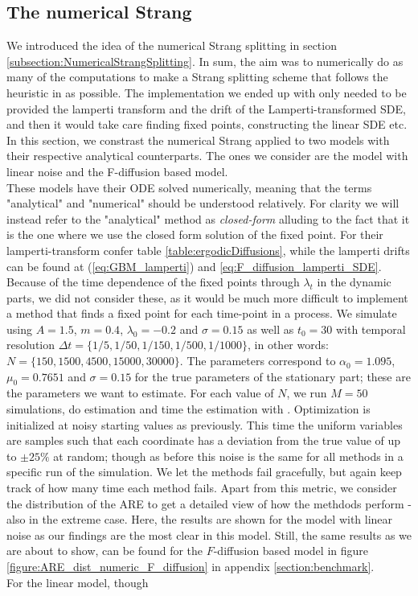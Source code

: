 \subsection{The numerical Strang}
We introduced the idea of the numerical Strang splitting in section \ref{subsection:NumericalStrangSplitting}. In sum, the aim was to numerically do as many of the computations to make a Strang splitting scheme that follows the heuristic in \cite{SplittingSchemes} as possible. The implementation we ended up with only needed to be provided the lamperti transform and the drift of the Lamperti-transformed SDE, and then it would take care finding fixed points, constructing the linear SDE etc. In this section, we constrast the numerical Strang applied to two models with their respective analytical counterparts. The ones we consider are the model with linear noise and the F-diffusion based model. \\These models have their ODE solved numerically, meaning that the terms "analytical" and "numerical" should be understood relatively. For clarity we will instead refer to the "analytical" method as \textit{closed-form} alluding to the fact that it is the one where we use the closed form solution of the fixed point. For their lamperti-transform confer table \ref{table:ergodicDiffusions}, while the lamperti drifts can be found at (\ref{eq:GBM_lamperti}) and \ref{eq:F_diffusion_lamperti_SDE}. Because of the time dependence of the fixed points through $\lambda_t$ in the dynamic parts, we did not consider these, as it would be much more difficult to implement a method that finds a fixed point for each time-point in a process. We simulate using $A = 1.5$, $m=0.4$, $\lambda_0 = -0.2$ and $\sigma =0.15$ as well as $t_0 = 30$ with temporal resolution $\Delta t = \{1/5, 1/50, 1/150, 1/500, 1/1000\}$, in other words: $N =  \{150, 1500, 4500, 15000, 30000\}$.  The parameters correspond to $\alpha_0 = 1.095$, $\mu_0 = 0.7651$ and $\sigma = 0.15$ for the true parameters of the stationary part; these are the parameters we want to estimate. For each value of $N$, we run $M = 50$ simulations, do estimation and time the estimation with . Optimization is initialized at noisy starting values as previously. This time the uniform variables are samples such that each coordinate has a deviation from the true value of up to $\pm 25\%$ at random; though as before this noise is the same for all methods in a specific run of the simulation. We let the methods fail gracefully, but again keep track of how many time each method fails. Apart from this metric, we consider the distribution of the ARE to get a detailed view of how the methdods perform - also in the extreme case. Here, the results are shown for the model with linear noise as our findings are the most clear in this model. Still, the same results as we are about to show, can be found for the $F$-diffusion based model in figure \ref{figure:ARE_dist_numeric_F_diffusion} in appendix \ref{section:benchmark}. \\For the linear model, though
